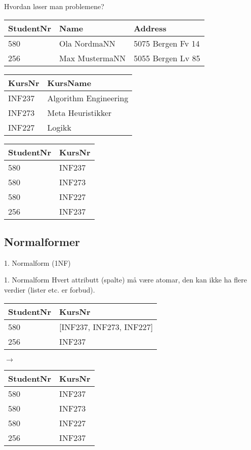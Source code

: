 \begin{frame}{Hvordan løser man problemene?}
\begin{tabular}{l|l|l}
 StudentNr & Name & Address\\\hline
 580 & Ola NordmaNN & 5075 Bergen Fv 14\\
 256 & Max MustermaNN & 5055 Bergen Lv 85\\
\end{tabular}
\vfill
\begin{tabular}{l|l}
KursNr & KursName \\\hline
INF237 & Algorithm Engineering\\
INF273 & Meta Heuristikker\\
INF227 & Logikk\\
\end{tabular}
\hfill
\begin{tabular}{l|l}
 StudentNr & KursNr\\\hline
 580 & INF237\\
 580 & INF273\\
 580 & INF227\\
 256 & INF237\\
\end{tabular}
\end{frame}

\subsection*{Normalformer}
\begin{frame}{1. Normalform (1NF)}
    \begin{block}{1. Normalform}
    Hvert attributt (spalte) må være atomar, den kan ikke ha flere verdier (lister etc. er forbud).
    \end{block}
    \vfill
    \pause
    \begin{tabular}{l|l}
     StudentNr & KursNr\\\hline
     580 & [INF237, INF273, INF227]\\
     256 & INF237\\
     \end{tabular}
     \hfill
     \pause
     $\rightarrow$
     \hfill
     \begin{tabular}{l|l}
     StudentNr & KursNr\\\hline
     580 & INF237\\
     580 & INF273\\
     580 & INF227\\
     256 & INF237\\
    \end{tabular}
\end{frame}

